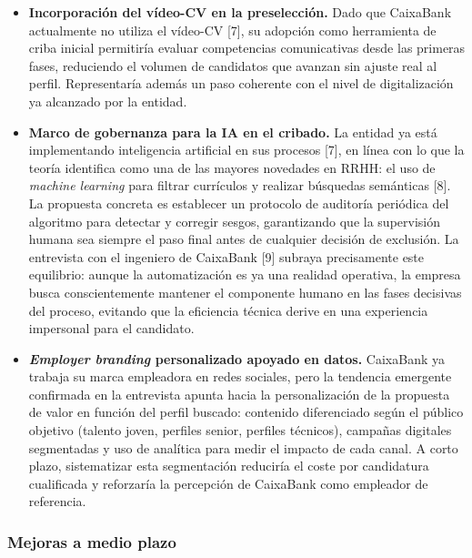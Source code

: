 \begin{itemize}
  \item \textbf{Incorporación del vídeo-CV en la preselección.} Dado que CaixaBank
        actualmente no utiliza el vídeo-CV [7], su adopción como herramienta de criba
        inicial permitiría evaluar competencias comunicativas desde las primeras fases,
        reduciendo el volumen de candidatos que avanzan sin ajuste real al perfil.
        Representaría además un paso coherente con el nivel de digitalización ya
        alcanzado por la entidad.

  \item \textbf{Marco de gobernanza para la IA en el cribado.} La entidad ya está
        implementando inteligencia artificial en sus procesos [7], en línea con lo que
        la teoría identifica como una de las mayores novedades en RRHH: el uso de
        \textit{machine learning} para filtrar currículos y realizar búsquedas semánticas
        [8]. La propuesta concreta es establecer un protocolo de auditoría periódica
        del algoritmo para detectar y corregir sesgos, garantizando que la supervisión
        humana sea siempre el paso final antes de cualquier decisión de exclusión. La
        entrevista con el ingeniero de CaixaBank [9] subraya precisamente este equilibrio:
        aunque la automatización es ya una realidad operativa, la empresa busca
        conscientemente mantener el componente humano en las fases decisivas del proceso,
        evitando que la eficiencia técnica derive en una experiencia impersonal para el
        candidato.

  \item \textbf{\textit{Employer branding} personalizado apoyado en datos.} CaixaBank
        ya trabaja su marca empleadora en redes sociales, pero la tendencia emergente
        confirmada en la entrevista apunta hacia la personalización de la propuesta de
        valor en función del perfil buscado: contenido diferenciado según el público
        objetivo (talento joven, perfiles senior, perfiles técnicos), campañas digitales
        segmentadas y uso de analítica para medir el impacto de cada canal. A corto
        plazo, sistematizar esta segmentación reduciría el coste por candidatura
        cualificada y reforzaría la percepción de CaixaBank como empleador de referencia.
\end{itemize}

\subsubsection{Mejoras a medio plazo}

